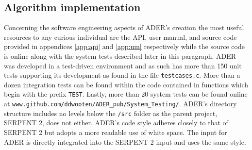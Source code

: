 \subsection{Algorithm implementation} \label{ssec:algorithm}
Concerning the software engineering aspects of ADER's creation the most 
useful resources to any curious individual are the API, user manual, and
source code provided in appendices \ref{app:api} and \ref{app:um}
respectively while the source code is online along with the system tests
described later in this paragraph. 
ADER was developed in a test-driven environment and as such
has more than 150 unit tests supporting its development as found in the file
\texttt{testcases.c}. More than a dozen integration tests can be found
within the code contained in functions which begin with the prefix
\texttt{TEST}. Lastly, more than 20 system tests can be found online
at \verb|www.github.com/ddwooten/ADER_pub/System_Testing/|. ADER's
directory structure includes no levels below the \texttt{/src} folder as
the parent project, SERPENT 2, does not either. ADER's code style adheres
closely to that of SERPENT 2 but adopts a more readable use of white space.
The input for ADER is directly integrated into the SERPENT 2 input and uses
the same style.
 
